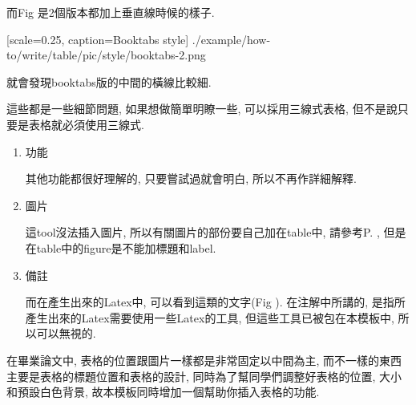   而Fig 是2個版本都加上垂直線時候的樣子.

    {
      [scale=0.25,
      caption={Booktabs style}]
      {./example/how-to/write/table/pic/style/booktabs-2.png}
    }

  就會發現booktabs版的中間的橫線比較細.

  這些都是一些細節問題, 如果想做簡單明瞭一些, 可以採用三線式表格, 但不是說只要是表格就必須使用三線式.

{}

  \begin{enumerate}

  \item
  {
    功能

    其他功能都很好理解的, 只要嘗試過就會明白, 所以不再作詳細解釋.
  } %

  \item
  {
    圖片

    這tool沒法插入圖片, 所以有關圖片的部份要自己加在table中, 請參考P. , 但是在table中的figure是不能加標題和label.
  } %

  \item
  {
    備註

    而在產生出來的Latex中, 可以看到這類的文字(Fig ). 在注解中所講的, 是指所產生出來的Latex需要使用一些Latex的工具, 但這些工具已被包在本模板中, 所以可以無視的.

  } %
  \end{enumerate}

\newpage
{}

在畢業論文中, 表格的位置跟圖片一樣都是非常固定以中間為主, 而不一樣的東西主要是表格的標題位置和表格的設計, 同時為了幫同學們調整好表格的位置, 大小和預設白色背景, 故本模板同時增加一個幫助你插入表格的功能.

